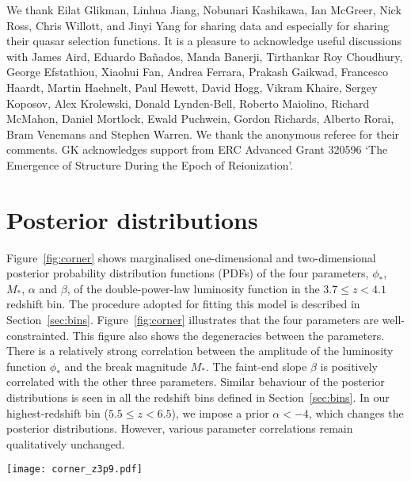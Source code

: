 \documentclass[fleqn,usenatbib]{mnras}
\newcommand{\new}[1]{{\color{notecolor} #1}}
\begin{document}
We thank Eilat Glikman, Linhua Jiang, Nobunari Kashi\-kawa, Ian
McGreer, Nick Ross, Chris Willott, and Jinyi Yang for sharing data and
especially for sharing their quasar selection functions.  It is a
pleasure to acknowledge useful discussions with James Aird, Eduardo
Ba\~nados, Manda Banerji, Tirthankar Roy Choudhury, George Efstathiou,
Xiaohui Fan, Andrea Ferrara, Prakash Gaikwad, Francesco Haardt, Martin
Haehnelt, Paul Hewett, David Hogg, Vikram Khaire, Sergey Koposov, Alex
Krolewski, Donald Lynden-Bell, Roberto Maiolino, Richard McMahon,
Daniel Mortlock, Ewald Puchwein, Gordon Richards, Alberto Rorai, Bram
Venemans and Stephen Warren.  \new{We thank the anonymous referee for
  their comments.} GK acknowledges support from ERC Advanced Grant
320596 `The Emergence of Structure During the Epoch of Reionization'.

\appendix

\section{Posterior distributions}

Figure~\ref{fig:corner} shows marginalised one-dimensional and
two-dimensional posterior probability distribution functions (PDFs) of
the four parameters, $\phi_*$, $M_*$, $\alpha$ and $\beta$, of the
double-power-law luminosity function in the $3.7\leq z < 4.1$ redshift
bin.  The procedure adopted for fitting this model is described in
Section~\ref{sec:bins}.  Figure~\ref{fig:corner} illustrates that the
four parameters are well-constrainted.  This figure also shows the
degeneracies between the parameters.  There is a relatively strong
correlation between the amplitude of the luminosity function $\phi_*$
and the break magnitude $M_*$.  The faint-end slope $\beta$ is
positively correlated with the other three parameters.  Similar
behaviour of the posterior distributions is seen in all the redshift
bins defined in Section~\ref{sec:bins}.  In our highest-redshift bin
($5.5\leq z < 6.5$), we impose a prior $\alpha < -4$, which changes
the posterior distributions.  However, various parameter correlations
remain qualitatively unchanged.

\begin{figure*}
  \begin{center}
    \texttt{[image: corner\_z3p9.pdf]}
  \end{center}
  \caption{Posterior distributions of the four double-power-law
    parameters in the $3.7\leq z < 4.1$ redshift bin.  The blue
    squares indicate median values.  Similar behaviour of the
    posterior distributions is seen in all other redshift bins defined
    in Section~\ref{sec:bins}.
    \label{fig:corner}}
\end{figure*}
\end{document}
